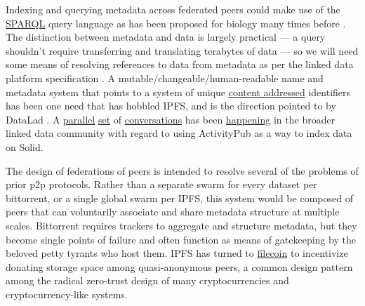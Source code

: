 Indexing and querying metadata across federated peers could make use of
the \href{https://www.w3.org/TR/sparql11-federated-query/}{SPARQL} query
language \citep{SPARQLFederatedQuery2013}  as has been proposed
for biology many times before \citep{simaEnablingSemanticQueries2019, djokic-petrovicPIBASFedSPARQLWebbased2017, hasnainBioFedFederatedQuery2017} . The distinction between metadata
and data is largely practical --- a query shouldn't require transferring
and translating terabytes of data --- so we will need some means of
resolving references to data from metadata as per the linked data
platform specification \citep{speicherLinkedDataPlatform2015} . A
mutable/changeable/human-readable name and metadata system that points
to a system of unique
\href{https://en.wikipedia.org/wiki/Content-addressable_storage}{content
addressed} identifiers has been one need that has hobbled IPFS, and is
the direction pointed to by DataLad \citep{hankeDefenseDecentralizedResearch2021} . A
\href{https://mastodon.social/@humanetech/107155144840782386}{parallel}
\href{https://web.archive.org/web/20211024082055/https://socialhub.activitypub.rocks/t/which-links-between-activitypub-and-solid-project/529}{set}
of
\href{https://web.archive.org/web/20211024080845/https://socialhub.activitypub.rocks/t/how-solid-and-activitypub-complement-each-other-best/727}{conversations}
has been
\href{https://web.archive.org/web/20211024081238/https://forum.solidproject.org/t/discussion-solid-vs-activitypub/2685}{happening}
in the broader linked data community with regard to using ActivityPub as
a way to index data on Solid.

The design of federations of peers is intended to resolve several of the
problems of prior p2p protocols. Rather than a separate swarm for every
dataset per bittorrent, or a single global swarm per IPFS, this system
would be composed of peers that can voluntarily associate and share
metadata structure at multiple scales. Bittorrent requires trackers to
aggregate and structure metadata, but they become single points of
failure and often function as means of gatekeeping by the beloved petty
tyrants who host them. IPFS has turned to
\href{https://filecoin.io/}{filecoin} to incentivize donating storage
space among quasi-anonymous peers, a common design pattern among the
radical zero-trust design of many cryptocurrencies and
cryptocurrency-like systems.

